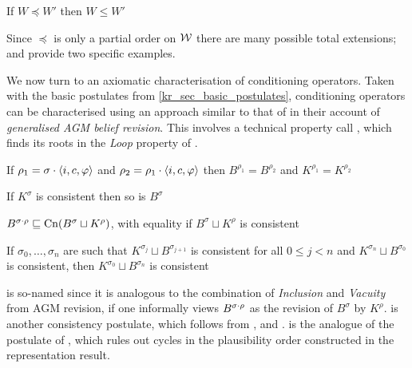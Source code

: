 
\begin{postulate}[\refinement{}]
    If $W \preceq W'$ then $W \le W'$
\end{postulate}

Since $\preceq$ is only a partial order on $\mathcal{W}$ there are many possible total
extensions; \varbasedcond{} and \partbasedcond{} provide two specific examples.

We now turn to an axiomatic characterisation of conditioning operators.
Taken with the basic postulates from \cref{kr_sec_basic_postulates},
conditioning operators can be characterised using an approach similar to that of
\textcite{delgrande2018general} in their account of \emph{generalised AGM belief
revision}.\footnotemark{} This involves a technical property
\citeauthor{delgrande2018general}
call , which finds its roots in the \emph{Loop}
property of \textcite{kraus1990nonmonotonic}.
%

\begin{postulate}[\duprem{}]
    If $\rho_1 = \sigma \cdot \langle {i, c, \varphi} \rangle$ and $\rho_2 = \rho_1
    \cdot \langle {i, c, \varphi} \rangle$ then $B^{\rho_1} = B^{\rho_2}$ and
    $K^{\rho_1} = K^{\rho_2}$
\end{postulate}
\begin{postulate}[\condcons{}]
    If $K^\sigma$ is consistent then so is $B^\sigma$
\end{postulate}
\begin{postulate}[\incvac{}]
    $B^{\sigma \cdot \rho} \sqsubseteq \operatorname{Cn}(B^\sigma \sqcup K^\rho)$, with
    equality if $B^\sigma \sqcup K^\rho$ is consistent
\end{postulate}
\begin{postulate}[\acyc{}]
    If $\sigma_0, \ldots, \sigma_n$ are such that $K^{\sigma_j} \sqcup
    B^{\sigma_{j+1}}$ is consistent for all $0 \le j < n$ and $K^{\sigma_n}
    \sqcup B^{\sigma_0}$ is consistent, then $K^{\sigma_0} \sqcup B^{\sigma_n}$
    is consistent
\end{postulate}

\incvac{} is so-named since it is analogous to the combination of
\emph{Inclusion} and \emph{Vacuity} from AGM revision, if one informally views
$B^{\sigma \cdot \rho}$ as the revision of $B^\sigma$ by $K^\rho$.
%
\condcons{} is another consistency postulate, which follows from
\consistency{},  \closure{} and \soundness{}.
%
\acyc{} is the analogue of the postulate of \citeauthor{delgrande2018general},
which rules out cycles in the plausibility order
constructed in the representation result.

